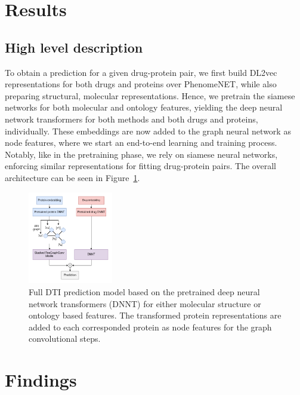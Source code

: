 \documentclass{bioinfo}
\begin{document}
\section{Results}

\subsection{High level description}
To obtain a prediction for a given drug-protein pair, we first build DL2vec representations for both drugs and proteins over PhenomeNET, while also preparing structural, molecular representations. Hence, we pretrain the siamese networks for both molecular and ontology features, yielding the deep neural network transformers for both methods and both drugs and proteins, individually. These embeddings are now added to the graph neural network as node features, where we start an end-to-end learning and training process. Notably, like in the pretraining phase, we rely on siamese neural networks, enforcing similar representations for fitting drug-protein pairs. The overall architecture can be seen in Figure~\ref{fig:Fullmodel}.

\begin{figure}[!tpb]%
	\centerline{\includegraphics[width=0.33\textwidth]{figures/full_model.png}}
	\caption{Full DTI prediction model based on the pretrained deep neural network transformers (DNNT) for either molecular structure or ontology based features. The transformed protein representations are added to each corresponded protein as node features for the graph convolutional steps. }
	\label{fig:Fullmodel}
\end{figure}


\section{Findings}
\end{document}

